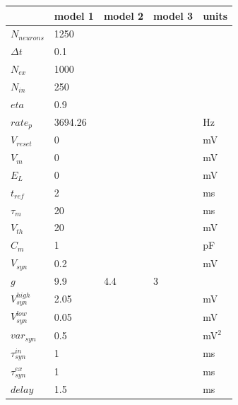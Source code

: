 \documentclass[11pt]{article}
\begin{document}
\begin{table}
\begin{tabular}{lllll}
\toprule
{} &    model 1 &    model 2 &    model 3 &       units \\
\midrule
$N_{neurons}$         &       1250 &        &        &             \\
$\Delta t$            &        0.1 &         &         &             \\
$N_{ex}$              &       1000 &        &        &             \\
$N_{in}$              &        250 &         &         &             \\
$eta$                 &        0.9 &         &         &             \\
$rate_{p}$            &    3694.26 &          &     &          Hz \\
$V_{reset}$           &          0 &           &           &          mV \\
$V_{m}$               &          0 &           &           &          mV \\
$E_{L}$               &          0 &           &           &          mV \\
$t_{ref}$             &          2 &           &           &          ms \\
$\tau_{m}$            &         20 &          &          &          ms \\
$V_{th}$              &         20 &          &          &          mV \\
$C_{m}$               &          1 &           &           &          pF \\
$V_{syn}$             &        0.2 &         &        &          mV \\
$g$                   &        9.9 &        4.4 &          3 &             \\
$V_{syn}^{high}$      &       2.05 &        &        &          mV \\
$V_{syn}^{low}$       &       0.05 &        &       &          mV \\
$var_{syn}$           &        0.5 &         &         &      mV$^2$ \\
$\tau_{syn}^{in}$     &          1 &           &           &          ms \\
$\tau_{syn}^{ex}$     &          1 &           &           &          ms \\
$delay$               &        1.5 &         &        &          ms \\

\end{tabular}
\end{table}
\end{document}
